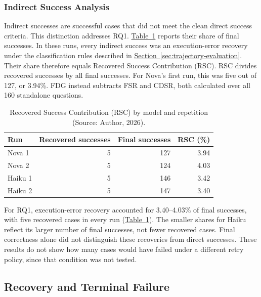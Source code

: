 \subsubsection{Indirect Success Analysis}

Indirect successes are successful cases that did not meet the clean direct
success criteria.
This distinction addresses RQ1.
\hyperref[tab:results-nondirect-share]{Table~\ref*{tab:results-nondirect-share}}
reports their share of final successes. 
In these runs, every indirect success was an execution-error recovery 
under the classification rules described in 
\hyperref[sec:trajectory-evaluation]{Section~\ref*{sec:trajectory-evaluation}}.
Their share therefore equals Recovered Success Contribution (RSC).
RSC divides recovered successes by all final successes.
For Nova's first run, this was five out of 127, or 3.94\%.
FDG instead subtracts FSR and CDSR, both calculated over all 160 standalone questions.

\begin{table}[H]
\centering
{\small
\setlength{\tabcolsep}{4pt}
\begin{tabularx}{\textwidth}{@{}>{\raggedright\arraybackslash}Xrrr@{}}
\toprule
\textbf{Run} & \textbf{Recovered successes} & \textbf{Final successes} & \textbf{RSC (\%)} \\
\midrule
Nova 1 & 5 & 127 & 3.94 \\
\addlinespace[0.4em]
Nova 2 & 5 & 124 & 4.03 \\
\addlinespace[0.4em]
Haiku 1 & 5 & 146 & 3.42 \\
\addlinespace[0.4em]
Haiku 2 & 5 & 147 & 3.40 \\
\bottomrule
\end{tabularx}
}
\caption{Recovered Success Contribution (RSC) by model and repetition (Source: Author, 2026).}
\label{tab:results-nondirect-share}
\end{table}

For RQ1, execution-error recovery accounted for 3.40--4.03\% of final successes,
with five recovered cases in every run
(\hyperref[tab:results-nondirect-share]{Table~\ref*{tab:results-nondirect-share}}).
The smaller shares for Haiku reflect its larger number of final successes,
not fewer recovered cases. Final correctness alone did not distinguish these
recoveries from direct successes. These results do not show how many
cases would have failed under a different retry policy, since that condition
was not tested.

\subsection{Recovery and Terminal Failure}
\label{sec:results-recovery}

